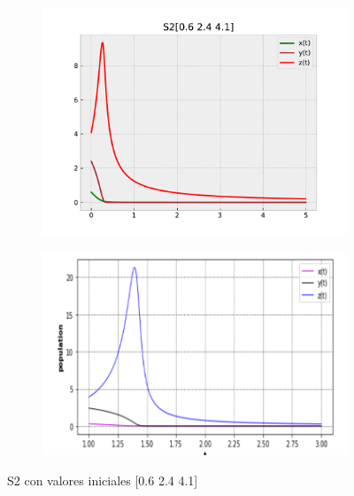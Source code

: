 \documentclass{wscpaperproc}
\theoremstyle{wsc}
\begin{document}
\begin{figure}[h]
	\centering
	\begin{subfigure}[b]{0.5\textwidth}
		\centering
		\includegraphics[width=\textwidth]{Simulations/S2[0.6 2.4 4.1].pdf}
	
		\label{fig:comparativa51}
	\end{subfigure}%
	\begin{subfigure}[b]{0.5\textwidth}
		\centering
		\includegraphics[width=\textwidth]{GraficasPaper/S2[1].png}
		\label{fig:comparativa52}
	\end{subfigure}
	\caption{S2 con valores iniciales [0.6 2.4 4.1]}

	\label{fig:comparacion6}
\end{figure}
\end{document}

